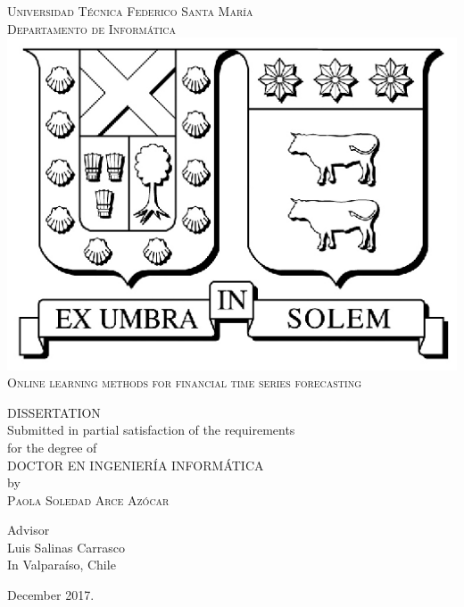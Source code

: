 \thispagestyle{empty}
\vspace{1.5in}
\begin{center}
{\textsc{Universidad T\'ecnica Federico Santa Mar\'ia}}\\
{\textsc{Departamento de Inform\'atica}}\\
\medskip
\includegraphics[scale=1]{fig/logo_usm.eps}
\bigskip
\bigskip
\bigskip
\bigskip \\
{\textsc{\Large{{Online learning methods for financial time series forecasting}}}}\\%

\bigskip
\bigskip
\bigskip
\bigskip
\bigskip 

{\MakeUppercase{Dissertation}\\
\bigskip
\bigskip
Submitted in partial satisfaction of the requirements\\
for the degree of\\
\bigskip
\bigskip
\MakeUppercase{Doctor en Ingenier\'ia Inform\'atica}\\
\bigskip
\bigskip
by\\
\bigskip
{\textsc{\large{Paola Soledad Arce Az\'ocar}}}\\
\bigskip

\bigskip
Advisor\\
Luis Salinas Carrasco\\
\bigskip
\bigskip
In Valpara\'iso, Chile}
\end{center}


\begin{center}
{\normalsize December 2017.}
\end{center}

\pagebreak

